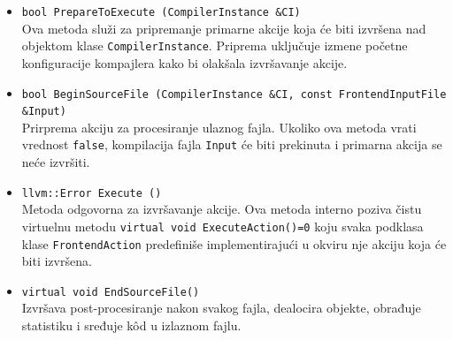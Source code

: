 \documentclass[12pt,oneside]{memoir}
\begin{document}
\begin{itemize}
  \item \texttt{bool PrepareToExecute (CompilerInstance \&CI)} \\
  Ova metoda slu\v{z}i za pripremanje primarne akcije koja \'{c}e biti izvr\v{s}ena nad objektom klase \texttt{CompilerInstance}.
  Priprema uklju\v{c}uje izmene po\v{c}etne konfiguracije kompajlera kako bi olak\v{s}ala izvr\v{s}avanje akcije.
  \item \texttt{bool BeginSourceFile (CompilerInstance \&CI, const FrontendInputFile \&Input)} \\
  Prirprema akciju za procesiranje ulaznog fajla. Ukoliko ova metoda vrati vrednost \texttt{false}, kompilacija fajla \texttt{Input} \'{c}e biti prekinuta
  i primarna akcija se ne\'{c}e izvr\v{s}iti.
  \item \texttt{llvm::Error Execute ()} \\
  Metoda odgovorna za izvr\v{s}avanje akcije. Ova metoda interno poziva \v{c}istu virtuelnu metodu \texttt{virtual void ExecuteAction()=0}
  koju svaka podklasa klase \texttt{FrontendAction} predefini\v{s}e implementiraju\'{c}i u okviru nje akciju koja \'ce biti izvr\v{s}ena.
  \item \texttt{virtual void EndSourceFile()} \\ 
  Izvr\v{s}ava post-procesiranje nakon svakog fajla, dealocira objekte, obrađuje statistiku i sređuje k\^{o}d  u izlaznom fajlu.
\end{itemize}
\end{document}
